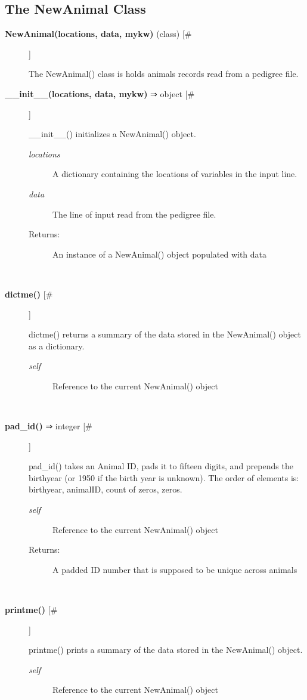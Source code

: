 \subsection*{The NewAnimal Class}
\begin{description}
\item[\textbf{NewAnimal(locations, data, mykw)} (class) [\#]
]
\par The NewAnimal() class is holds animals records read from a pedigree file.

\item[\textbf{\_\_init\_\_(locations, data, mykw)} ⇒ object [\#]
]
\par \_\_init\_\_() initializes a NewAnimal() object.
\begin{description}
\item[\textit{locations}
]
A dictionary containing the locations of variables in the input line.
\item[\textit{data}
]
The line of input read from the pedigree file.
\item[Returns:
]
An instance of a NewAnimal() object populated with data
\end{description}\\

\item[\textbf{dictme()} [\#]
]
\par dictme() returns a summary of the data stored in the NewAnimal() object
as a dictionary.
\begin{description}
\item[\textit{self}
]
Reference to the current NewAnimal() object
\end{description}\\

\item[\textbf{pad\_id()} ⇒ integer [\#]
]
\par pad\_id() takes an Animal ID, pads it to fifteen digits, and prepends the birthyear
(or 1950 if the birth year is unknown).  The order of elements is: birthyear, animalID,
count of zeros, zeros.
\begin{description}
\item[\textit{self}
]
Reference to the current NewAnimal() object
\item[Returns:
]
A padded ID number that is supposed to be unique across animals
\end{description}\\

\item[\textbf{printme()} [\#]
]
\par printme() prints a summary of the data stored in the NewAnimal() object.
\begin{description}
\item[\textit{self}
]
Reference to the current NewAnimal() object
\end{description}\\


\end{description}
